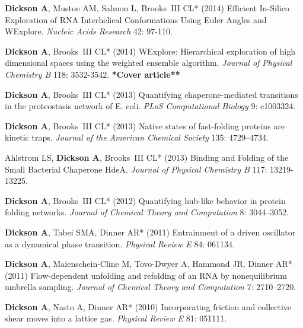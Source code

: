\documentclass[margin,line]{res}
\begin{document}
\begin{resume}
\begin{spacing}{1.2}
\begin{thebibliography}{10}
{\bf Dickson A}, Mustoe AM, Salmon L, Brooks~{III} CL* (2014)
 Efficient In-Silico Exploration of {RNA} Interhelical Conformations Using Euler Angles and {WE}xplore.
\newblock \textit{Nucleic Acids Research} 42: 97-110.

{\bf Dickson A}, Brooks~{III} CL* (2014) {WE}xplore: Hierarchical
  exploration of high dimensional spaces using the weighted ensemble algorithm.
\newblock \textit{Journal of Physical Chemistry B} 118: 3532-3542. {\bf **Cover article**}

{\bf Dickson A}, Brooks~{III} CL* (2013) Quantifying chaperone-mediated
  transitions in the proteostasis network of {E}. coli.
\newblock \textit{PLoS Computational Biology} 9: e1003324.

{\bf Dickson A}, Brooks~{III} CL* (2013) {Native states of fast-folding proteins are
  kinetic traps.}
\newblock \textit{Journal of the American Chemical Society} 135: 4729--4734.

  Ahlstrom LS, {\bf Dickson A}, Brooks~{III} CL* (2013)
  Binding and Folding of the Small Bacterial Chaperone HdeA.
\newblock \textit{Journal of Physical Chemistry B} 117: 13219-13225.

{\bf Dickson A}, Brooks~{III} CL* (2012) Quantifying hub-like behavior in protein
  folding networks.
\newblock \textit{Journal of Chemical Theory and Computation} 8: 3044--3052.

{\bf Dickson A}, Tabei SMA, Dinner AR* (2011) {Entrainment of a driven oscillator as a
  dynamical phase transition}.
\newblock \textit{Physical Review E} 84: 061134.

{\bf Dickson A}, Maienschein-Cline M, Tovo-Dwyer A, Hammond JR, Dinner AR* (2011)
  Flow-dependent unfolding and refolding of an {RNA} by nonequilibrium umbrella
  sampling.
\newblock \textit{Journal of Chemical Theory and Computation} 7: 2710--2720.

{\bf Dickson A}, Nasto A, Dinner AR* (2010) {Incorporating friction and collective
  shear moves into a lattice gas.}
\newblock \textit{Physical Review E} 81: 051111.


\end{thebibliography}
\end{spacing}
\end{resume}
\end{document}
